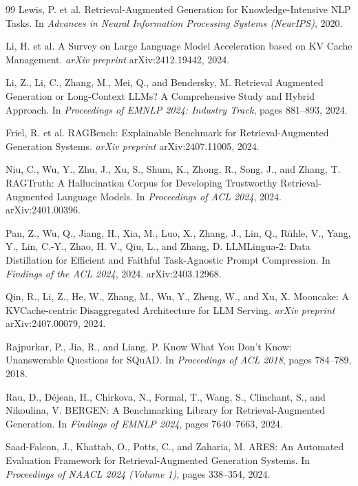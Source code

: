 \documentclass[12pt,a4paper]{article}
\begin{document}
\begin{thebibliography}{99}
Lewis, P. et al. Retrieval-Augmented Generation for Knowledge-Intensive NLP Tasks. In \textit{Advances in Neural Information Processing Systems (NeurIPS)}, 2020.

Li, H. et al. A Survey on Large Language Model Acceleration based on KV Cache Management. \textit{arXiv preprint} arXiv:2412.19442, 2024.

Li, Z., Li, C., Zhang, M., Mei, Q., and Bendersky, M. Retrieval Augmented Generation or Long-Context LLMs? A Comprehensive Study and Hybrid Approach. In \textit{Proceedings of EMNLP 2024: Industry Track}, pages 881--893, 2024.

Friel, R. et al. RAGBench: Explainable Benchmark for Retrieval-Augmented Generation Systems. \textit{arXiv preprint} arXiv:2407.11005, 2024.

Niu, C., Wu, Y., Zhu, J., Xu, S., Shum, K., Zhong, R., Song, J., and Zhang, T. RAGTruth: A Hallucination Corpus for Developing Trustworthy Retrieval-Augmented Language Models. In \textit{Proceedings of ACL 2024}, 2024. arXiv:2401.00396.

Pan, Z., Wu, Q., Jiang, H., Xia, M., Luo, X., Zhang, J., Lin, Q., Rühle, V., Yang, Y., Lin, C.-Y., Zhao, H. V., Qiu, L., and Zhang, D. LLMLingua-2: Data Distillation for Efficient and Faithful Task-Agnostic Prompt Compression. In \textit{Findings of the ACL 2024}, 2024. arXiv:2403.12968.

Qin, R., Li, Z., He, W., Zhang, M., Wu, Y., Zheng, W., and Xu, X. Mooncake: A KVCache-centric Disaggregated Architecture for LLM Serving. \textit{arXiv preprint} arXiv:2407.00079, 2024.

Rajpurkar, P., Jia, R., and Liang, P. Know What You Don't Know: Unanswerable Questions for SQuAD. In \textit{Proceedings of ACL 2018}, pages 784--789, 2018.

Rau, D., Déjean, H., Chirkova, N., Formal, T., Wang, S., Clinchant, S., and Nikoulina, V. BERGEN: A Benchmarking Library for Retrieval-Augmented Generation. In \textit{Findings of EMNLP 2024}, pages 7640--7663, 2024.

Saad-Falcon, J., Khattab, O., Potts, C., and Zaharia, M. ARES: An Automated Evaluation Framework for Retrieval-Augmented Generation Systems. In \textit{Proceedings of NAACL 2024 (Volume 1)}, pages 338--354, 2024.


\end{thebibliography}
\end{document}
